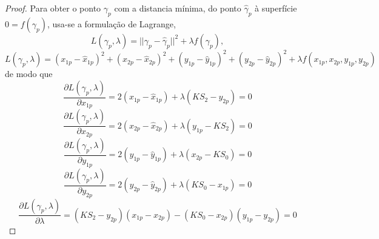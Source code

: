 \documentclass[a4paper,10pt]{article}
\begin{document}
\begin{proof}

Para obter o ponto $\gamma_p$ 
com a distancia mínima, do ponto $\hat{\gamma}_p$ à superfície $0=f(\gamma_p)$,
usa-se a formulação de Lagrange, 
\begin{equation}\label{eq:tikon1a}
 L(\gamma_p,\lambda)= ||\gamma_p-\hat{\gamma}_p||^2+\lambda f(\gamma_p),
\end{equation}
\begin{equation}\label{eq:tikon1}
 L(\gamma_p,\lambda)=(x_{1p}-\hat{x}_{1p})^2+(x_{2p}-\hat{x}_{2p})^2+(y_{1p}-\hat{y}_{1p})^2+(y_{2p}-\hat{y}_{2p})^2 +\lambda f(x_{1p},x_{2p},y_{1p},y_{2p})
\end{equation}
de modo que
\begin{equation}\label{eq:tikon2}
 \frac{\partial L(\gamma_p,\lambda)}{\partial x_{1p}}=2(x_{1p}-\hat{x}_{1p})+ \lambda (K S_2 -y_{2p})=0 
\end{equation}
\begin{equation}\label{eq:tikon3}
 \frac{\partial L(\gamma_p,\lambda)}{\partial x_{2p}}=2(x_{2p}-\hat{x}_{2p})+ \lambda ( y_{1p} - K S_2)=0 
\end{equation}
\begin{equation}\label{eq:tikon4}
 \frac{\partial L(\gamma_p,\lambda)}{\partial y_{1p}}=2(y_{1p}-\hat{y}_{1p})+ \lambda (x_{2p} - K S_0)=0 
\end{equation} 
\begin{equation}\label{eq:tikon5}
 \frac{\partial L(\gamma_p,\lambda)}{\partial y_{2p}}=2(y_{2p}-\hat{y}_{2p})+ \lambda ( K S_0 - x_{1p})=0 
\end{equation} 
\begin{equation}\label{eq:tikon6}
 \frac{\partial L(\gamma_p,\lambda)}{\partial \lambda}=(KS_2-y_{2p})(x_{1p}-x_{2p})-(KS_0-x_{2p})(y_{1p}-y_{2p})=0 
\end{equation} 


\end{proof}
\end{document}
